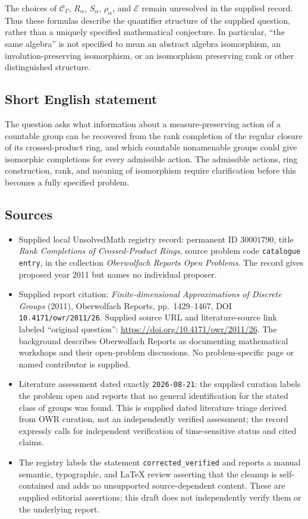 \documentclass[11pt]{article}
\begin{document}
The choices of \(\mathcal C_\Gamma\), \(R_\alpha\), \(S_\alpha\), \(\rho_\alpha\), and \(\mathcal E\) remain unresolved in the supplied record. Thus these formulas describe the quantifier structure of the supplied question, rather than a uniquely specified mathematical conjecture. In particular, ``the same algebra'' is not specified to mean an abstract algebra isomorphism, an involution-preserving isomorphism, or an isomorphism preserving rank or other distinguished structure.
\subsection{Short English statement}
The question asks what information about a measure-preserving action of a countable group can be recovered from the rank completion of the regular closure of its crossed-product ring, and which countable nonamenable groups could give isomorphic completions for every admissible action. The admissible actions, ring construction, rank, and meaning of isomorphism require clarification before this becomes a fully specified problem.
\subsection{Sources}
\begin{itemize}
\item Supplied local UnsolvedMath registry record: permanent ID \(30001790\), title \emph{Rank Completions of Crossed-Product Rings}, source problem code \texttt{catalogue entry}, in the collection \emph{Oberwolfach Reports Open Problems}. The record gives proposed year 2011 but names no individual proposer.
\item Supplied report citation: \emph{Finite-dimensional Approximations of Discrete Groups} (2011), Oberwolfach Reports, pp.~1429--1467, DOI \texttt{10.4171/owr/2011/26}. Supplied source URL and literature-source link labeled ``original question'': \url{https://doi.org/10.4171/owr/2011/26}. The background describes Oberwolfach Reports as documenting mathematical workshops and their open-problem discussions. No problem-specific page or named contributor is supplied.
\item Literature assessment dated exactly \texttt{2026-08-21}: the supplied curation labels the problem open and reports that no general identification for the stated class of groups was found. This is supplied dated literature triage derived from OWR curation, not an independently verified assessment; the record expressly calls for independent verification of time-sensitive status and cited claims.
\item The registry labels the statement \texttt{corrected\_verified} and reports a manual semantic, typographic, and LaTeX review asserting that the cleanup is self-contained and adds no unsupported source-dependent content. These are supplied editorial assertions; this draft does not independently verify them or the underlying report.
\end{itemize}
\end{document}
